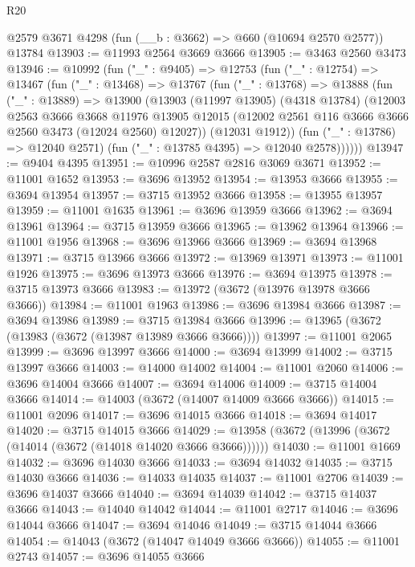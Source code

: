 \begin{lexlean}{R20}
\begin{coremodule}
    @2579
    @3671
    @4298
    (fun (__b : @3662) => @660 (@10694 @2570 @2577))
    @13784
@13903 := @11993 @2564 @3669 @3666
@13905 := @3463 @2560 @3473
@13946 := @10992
    (fun ("_" : @9405) =>
    @12753
      (fun ("_" : @12754) =>
      @13467
        (fun ("_" : @13468) =>
        @13767
          (fun ("_" : @13768) =>
          @13888
            (fun ("_" : @13889) =>
            @13900
              (@13903
                (@11997 @13905)
                (@4318 @13784)
                (@12003
                  @2563
                  @3666
                  @3668
                  @11976
                  @13905
                  @12015
                  (@12002 @2561 @116 @3666 @3666 @2560 @3473 (@12024 @2560) @12027))
                (@12031 @1912))
              (fun ("_" : @13786) => @12040 @2571)
              (fun ("_" : @13785 @4395) => @12040 @2578))))))
@13947 := @9404 @4395
@13951 := @10996 @2587 @2816 @3069 @3671
@13952 := @11001 @1652
@13953 := @3696 @13952
@13954 := @13953 @3666
@13955 := @3694 @13954
@13957 := @3715 @13952 @3666
@13958 := @13955 @13957
@13959 := @11001 @1635
@13961 := @3696 @13959 @3666
@13962 := @3694 @13961
@13964 := @3715 @13959 @3666
@13965 := @13962 @13964
@13966 := @11001 @1956
@13968 := @3696 @13966 @3666
@13969 := @3694 @13968
@13971 := @3715 @13966 @3666
@13972 := @13969 @13971
@13973 := @11001 @1926
@13975 := @3696 @13973 @3666
@13976 := @3694 @13975
@13978 := @3715 @13973 @3666
@13983 := @13972 (@3672 (@13976 @13978 @3666 @3666))
@13984 := @11001 @1963
@13986 := @3696 @13984 @3666
@13987 := @3694 @13986
@13989 := @3715 @13984 @3666
@13996 := @13965 (@3672 (@13983 (@3672 (@13987 @13989 @3666 @3666))))
@13997 := @11001 @2065
@13999 := @3696 @13997 @3666
@14000 := @3694 @13999
@14002 := @3715 @13997 @3666
@14003 := @14000 @14002
@14004 := @11001 @2060
@14006 := @3696 @14004 @3666
@14007 := @3694 @14006
@14009 := @3715 @14004 @3666
@14014 := @14003 (@3672 (@14007 @14009 @3666 @3666))
@14015 := @11001 @2096
@14017 := @3696 @14015 @3666
@14018 := @3694 @14017
@14020 := @3715 @14015 @3666
@14029 := @13958 (@3672 (@13996 (@3672 (@14014 (@3672 (@14018 @14020 @3666 @3666))))))
@14030 := @11001 @1669
@14032 := @3696 @14030 @3666
@14033 := @3694 @14032
@14035 := @3715 @14030 @3666
@14036 := @14033 @14035
@14037 := @11001 @2706
@14039 := @3696 @14037 @3666
@14040 := @3694 @14039
@14042 := @3715 @14037 @3666
@14043 := @14040 @14042
@14044 := @11001 @2717
@14046 := @3696 @14044 @3666
@14047 := @3694 @14046
@14049 := @3715 @14044 @3666
@14054 := @14043 (@3672 (@14047 @14049 @3666 @3666))
@14055 := @11001 @2743
@14057 := @3696 @14055 @3666

\end{coremodule}
\end{lexlean}
